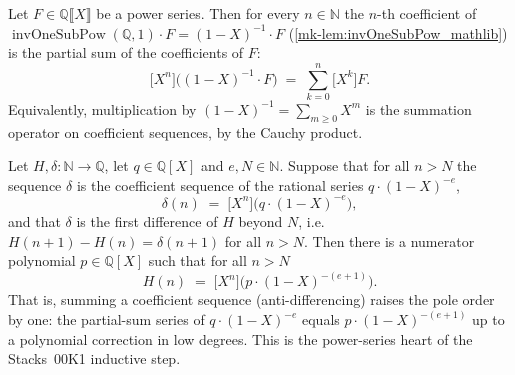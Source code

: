 \begin{lemma}\label{mk-lem:coeff_invOneSubPow_one_mul}
  \leanok

  Let \(F \in \mathbb{Q}\llbracket X\rrbracket\) be a power series. Then for every
  \(n \in \mathbb{N}\) the \(n\)-th coefficient of
  \(\operatorname{invOneSubPow}(\mathbb{Q}, 1)\cdot F = (1-X)^{-1}\cdot F\)
  (\ref{mk-lem:invOneSubPow_mathlib}) is the partial sum of the coefficients of
  \(F\):
  \[
    \bigl[X^n\bigr]\bigl((1-X)^{-1}\cdot F\bigr)
    \;=\; \sum_{k=0}^{n} \bigl[X^k\bigr] F .
  \]
  Equivalently, multiplication by \((1-X)^{-1} = \sum_{m\ge 0} X^m\) is the
  summation operator on coefficient sequences, by the Cauchy product.
\end{lemma}

\begin{lemma}\label{mk-lem:rationalHilbert_antidiff}
  \leanok

  Let \(H, \delta : \mathbb{N} \to \mathbb{Q}\), let \(q \in \mathbb{Q}[X]\) and
  \(e, N \in \mathbb{N}\). Suppose that for all \(n > N\) the sequence \(\delta\)
  is the coefficient sequence of the rational series \(q\cdot(1-X)^{-e}\),
  \[
    \delta(n) \;=\; \bigl[X^n\bigr]\bigl(q\cdot(1-X)^{-e}\bigr),
  \]
  and that \(\delta\) is the first difference of \(H\) beyond \(N\), i.e.
  \(H(n+1) - H(n) = \delta(n+1)\) for all \(n > N\). Then there is a numerator
  polynomial \(p \in \mathbb{Q}[X]\) such that for all \(n > N\)
  \[
    H(n) \;=\; \bigl[X^n\bigr]\bigl(p\cdot(1-X)^{-(e+1)}\bigr).
  \]
  That is, summing a coefficient sequence (anti-differencing) raises the pole
  order by one: the partial-sum series of \(q\cdot(1-X)^{-e}\) equals
  \(p\cdot(1-X)^{-(e+1)}\) up to a polynomial correction in low degrees. This is
  the power-series heart of the Stacks~00K1 inductive step.
\end{lemma}

